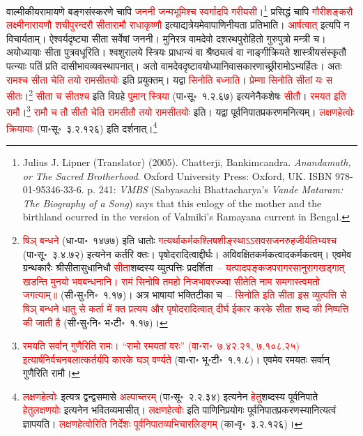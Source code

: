 \begin{sloppypar}\justifying\noindent वाल्मीकीय\-रामायणे बङ्ग\-संस्करणे चापि \textcolor{red}{जननी जन्मभूमिश्च स्वर्गादपि गरीयसी}।\footnote{{\englishfont Julius J. Lipner (Translator) (2005). Chatterji, Bankimcandra. \textit{Anandamath, or The Sacred Brotherhood}. Oxford University Press: Oxford, UK. ISBN 978-01-95346-33-6. p. 241: \textit{VMBS} (Sabyasachi Bhattacharya's \textit{Vande Mataram: The Biography of a Song}) says that this eulogy of the mother and the birthland ocurred in the version of Valmiki's Ramayana current in Bengal}.} प्रसिद्धं चापि \textcolor{red}{गौरी\-शङ्करौ लक्ष्मी\-नारायणौ शची\-पुरन्दरौ सीता\-रामौ राधा\-कृष्णौ} इत्याद्यत्रेयमेवापाणिनीयता प्रतिभाति। \textcolor{red}{आर्षत्वात्‌} इत्यपि न विचार्यताम्। ऐश्वर्य\-दृष्ट्या सीता सर्वेषां जननी। मुनिरत्र वामदेवो दशरथ\-पुरोहितो गुरु\-पुत्रो मन्त्री च। अयोध्यायाः सीता पुत्र\-वधूरिति। श्वशुरालये स्त्रियः प्राधान्यं वा श्रैष्ठ्यत्वं वा नाङ्गीक्रियते शास्त्रीय\-संस्कृतौ पत्न्याः पतिं प्रति दासीभाव\-व्यवस्थापनात्। अतो वामदेव\-दृष्टावयोध्या\-निवास\-कारणाच्छ्रीरामोऽभ्यर्हितः। अतः \textcolor{red}{रामश्च सीता चेति तयो रामसीतयोः} इति प्रयुक्तम्। यद्वा \textcolor{red}{सिनोति बध्नाति}। \textcolor{red}{प्रेम्णा सिनोति सीतां यः स सीतः}।\footnote{\textcolor{red}{षिञ् बन्धने} (धा॰पा॰~१४७७) इति धातोः \textcolor{red}{गत्यर्थाकर्मक\-श्लिष\-शीङ्स्थाऽऽस\-वस\-जन\-रुह\-जीर्यतिभ्यश्च} (पा॰सू॰~३.४.७२) इत्यनेन कर्तरि क्तः। पृषोदरादित्वाद्दीर्घः। अविवक्षित\-कर्मकत्वादकर्मकत्वम्। एवमेव ग्रन्थ\-कारैः श्रीसीता\-सुधा\-निधौ \textcolor{red}{सीता}\-शब्दस्य व्युत्पत्तिः प्रदर्शिता~– \textcolor{red}{यत्पाद\-पङ्कज\-पराग\-रसानुराग\-खड्गात् खडन्ति मुनयो भवबन्धनानि। रामं सिनोषि तमहो निजभाव\-रज्ज्वा सीतेति नाम समगास्त्वमतो जगत्याम्॥} (सी॰सु॰नि॰~१.१७)। अत्र भाषायां भक्तिटीका च~– \textcolor{red}{सिनोति इति सीता इस व्युत्पत्ति से षिञ् बन्धने धातु से कर्ता में क्त प्रत्यय और पृषोदरादित्वात् दीर्घ ईकार करके सीता शब्द की निष्पत्ति की जाती है} (सी॰सु॰नि॰ भ॰टी॰~१.१७)।} \textcolor{red}{सीता च सीतश्च} इति विग्रहे \textcolor{red}{पुमान् स्त्रिया} (पा॰सू॰~१.२.६७) इत्यनेनैक\-शेषः \textcolor{red}{सीतौ}। \textcolor{red}{रमयत इति रामौ}।\footnote{\textcolor{red}{रमयति सर्वान् गुणैरिति रामः। “रामो रमयतां वरः” (वा॰रा॰~७.४२.२१, ७.१०८.२५) इत्यार्ष\-निर्वचन\-बलात्कर्तर्यपि कारके घञ् वर्ण्यते} (वा॰रा॰ भू॰टी॰~१.१.८)। एवमेव रमयतः सर्वान् गुणैरिति रामौ।} \textcolor{red}{रामौ च तौ सीतौ चेति राम\-सीतौ तयो राम\-सीतयोः} इति। यद्वा पूर्व\-निपात\-प्रकरणमनित्यम्। \textcolor{red}{लक्षण\-हेत्वोः क्रियायाः} (पा॰सू॰~३.२.१२६) इति दर्शनात्।\footnote{\textcolor{red}{लक्षण\-हेत्वोः} इत्यत्र द्वन्द्व\-समासे \textcolor{red}{अल्पाच्तरम्} (पा॰सू॰~२.२.३४) इत्यनेन \textcolor{red}{हेतु}\-शब्दस्य पूर्व\-निपाते \textcolor{red}{हेतु\-लक्षणयोः} इत्यनेन भवितव्यमासीत्। \textcolor{red}{लक्षण\-हेत्वोः} इति पाणिनि\-प्रयोगः पूर्व\-निपात\-प्रकरणस्यानित्यत्वं ज्ञापयति। \textcolor{red}{लक्षण\-हेत्वोरिति निर्देशः पूर्वनिपात\-व्यभिचार\-लिङ्गम्} (का॰वृ॰~३.२.१२६)।}\end{sloppypar}
